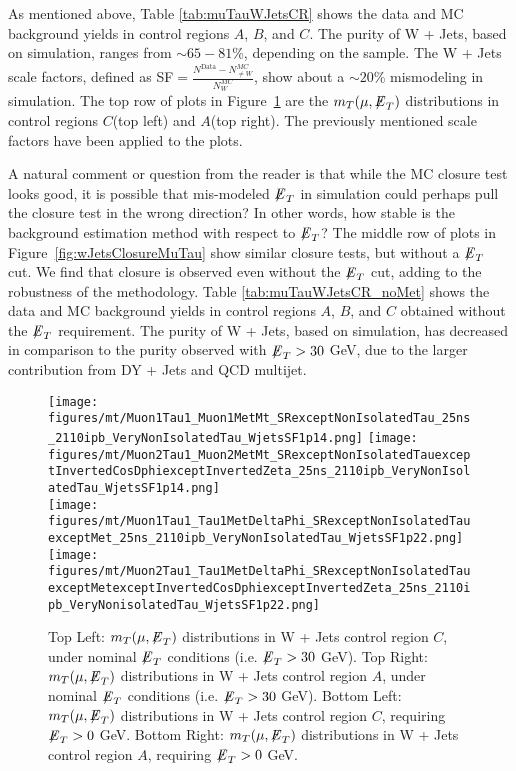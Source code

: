As mentioned above, Table \ref{tab:muTauWJetsCR} shows the data and MC background yields in control regions $A$, $B$, and $C$. The purity of W + Jets, based on 
simulation, ranges from $\sim 65-81$\%, depending on the sample. The W + Jets scale factors, defined as SF$=\frac{N^{\textrm{Data}}-N_{\neq 
W}^{MC}}{N_{W}^{MC}}$, show about a $\sim 20$\% mismodeling in simulation. The top row of plots in Figure~\ref{fig:wJetsControlPlotsMuTau} are the 
$m_{T}(\mu,{\not\mathrel{E}}_T)$ distributions in control regions $C$(top left) and $A$(top right). The previously mentioned scale factors have been applied to the plots. 

A natural comment or question from the reader is that while the MC closure test looks good, it is possible that mis-modeled ${\not\mathrel{E}}_T$ in simulation could perhaps 
pull the closure test in the wrong direction? In other words, how stable is the background estimation method with respect to ${\not\mathrel{E}}_T$? The middle row of plots in 
Figure~\ref{fig:wJetsClosureMuTau} show similar closure tests, but without a ${\not\mathrel{E}}_T$ cut. We find that closure is observed even without the ${\not\mathrel{E}}_T$ cut, adding 
to the robustness of the methodology. Table \ref{tab:muTauWJetsCR_noMet} shows the data and MC background yields in control regions $A$, $B$, and $C$ obtained 
without the ${\not\mathrel{E}}_T$ requirement. The purity 
of W + Jets, based on simulation, has decreased in comparison to the purity observed with ${\not\mathrel{E}}_T > 30$ GeV, due to the larger contribution from DY + Jets and QCD 
multijet. 

\begin{figure}\centering
  \texttt{[image: figures/mt/Muon1Tau1\_Muon1MetMt\_SRexceptNonIsolatedTau\_25ns\_2110ipb\_VeryNonIsolatedTau\_WjetsSF1p14.png]}
  \texttt{[image: figures/mt/Muon2Tau1\_Muon2MetMt\_SRexceptNonIsolatedTauexceptInvertedCosDphiexceptInvertedZeta\_25ns\_2110ipb\_VeryNonIsolatedTau\_WjetsSF1p14.png]} \\
  \texttt{[image: figures/mt/Muon1Tau1\_Tau1MetDeltaPhi\_SRexceptNonIsolatedTauexceptMet\_25ns\_2110ipb\_VeryNonIsolatedTau\_WjetsSF1p22.png]}
  \texttt{[image: figures/mt/Muon2Tau1\_Tau1MetDeltaPhi\_SRexceptNonIsolatedTauexceptMetexceptInvertedCosDphiexceptInvertedZeta\_25ns\_2110ipb\_VeryNonisolatedTau\_WjetsSF1p22.png]}
  \caption{\label{fig:wJetsControlPlotsMuTau} Top Left: $m_{T}(\mu,{\not\mathrel{E}}_T)$ distributions in W + Jets control region $C$, under nominal ${\not\mathrel{E}}_T$
conditions (i.e. ${\not\mathrel{E}}_T > 30$ GeV).  Top Right: $m_{T}(\mu,{\not\mathrel{E}}_T)$ distributions in W + Jets control region $A$, under nominal ${\not\mathrel{E}}_T$
conditions (i.e. ${\not\mathrel{E}}_T > 30$ GeV).  Bottom Left:  $m_{T}(\mu,{\not\mathrel{E}}_T)$ distributions in W + Jets control region $C$, requiring ${\not\mathrel{E}}_T > 0$ GeV.  Bottom Right: 
$m_{T}(\mu,{\not\mathrel{E}}_T)$ distributions in W + Jets control region $A$, requiring ${\not\mathrel{E}}_T > 0$ GeV.} 
\end{figure}

